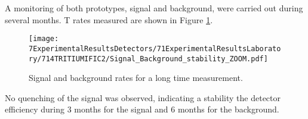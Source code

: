 


A monitoring of both prototypes, signal and background, were carried out during several months. T rates measured are shown in Figure \ref{fig:MonitorizationTRITIUMIFIC2}.

\begin{figure}[h]
\centering
\texttt{[image: 7ExperimentalResultsDetectors/71ExperimentalResultsLaboratory/714TRITIUMIFIC2/Signal\_Background\_stability\_ZOOM.pdf]}
\caption{Signal and background rates for a long time measurement.\label{fig:MonitorizationTRITIUMIFIC2}}
\end{figure}
No quenching of the signal was observed, indicating a stability the detector efficiency during 3 months for the signal and 6 months for the background. %









